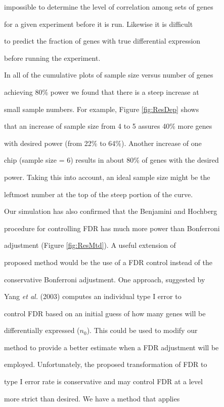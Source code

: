 \documentclass[12pt]{article}
\begin{document}
impossible to determine the level of correlation among sets of genes

for a given experiment before it is run.  Likewise it is difficult

to predict the fraction of genes with true differential expression

before running the experiment.



In all of the cumulative plots of sample size versus number of genes

achieving 80\% power we found that there is a steep increase at

small sample numbers. For example, Figure \ref{fig:ResDep} shows

that an increase of sample size from 4 to 5 assures 40\% more genes

with desired power (from 22\% to 64\%).  Another increase of one

chip (sample size = 6) results in about 80\% of genes with the desired

power. Taking this into account, an ideal sample size might be the

leftmost number at the top of the steep portion of the curve.



Our simulation has also confirmed that the Benjamini and Hochberg

procedure for controlling FDR has much more power than Bonferroni

adjustment (Figure \ref{fig:ResMtd}). A useful extension of

proposed method would be the use of a FDR control instead of the

conservative Bonferroni adjustment. One approach, suggested by

Yang \textit{et al.} (2003) computes an individual type I error to

control FDR based on an initial guess of how many genes will be

differentially expressed ($n_0$). This could be used to modify our

method to provide a better estimate when a FDR adjustment will be

employed.  Unfortunately, the proposed transformation of FDR to

type I error rate is conservative and may control FDR at a level

more strict than desired. We have a method that applies
\end{document}
